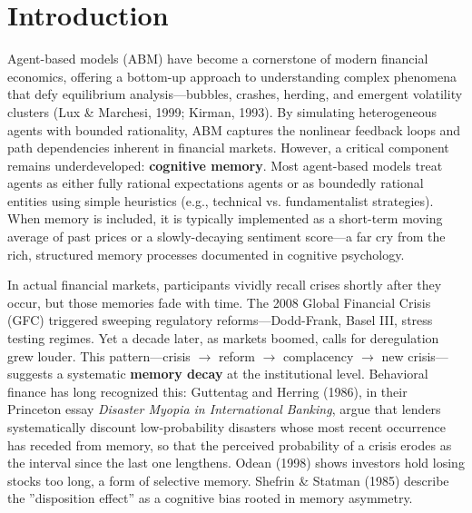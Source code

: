 \documentclass[11pt]{article}
\begin{document}
\begin{abstract}
it reduces return. The original 15.0\% gap (3947 vs 3434) was measured under the default memory bank (initial stabilities 5/3/2, not S=45) and is a seed/network artifact; it is retained in Section 5.2 for audit only. The effective policy on 30 agents is non-intervention. The 1,000-agent run rerun at S=45 (Section 5.3; v49 pre-fix, v50 post-fix identical) gives identical returns for both policies (-1065.35, interventions 0.0), so the v47/v48 374\% figure does not survive at S=45 and is retained in Section 5.3 for audit only (see Section 6.4, limitation 11). Our work bridges cognitive psychology and computational finance: the primary implication is about model choice --- memory kernels, not policy levers, decide how long markets remember.

\textbf{Keywords:} spaced repetition, cognitive memory, agent-based modeling, FSRS, power-law forgetting, POMDP

\textbf{JEL codes:} G01, G17, C63

\end{abstract}
\section{Introduction}
Agent-based models (ABM) have become a cornerstone of modern financial economics, offering a bottom-up approach to understanding complex phenomena that defy equilibrium analysis---bubbles, crashes, herding, and emergent volatility clusters (Lux \& Marchesi, 1999; Kirman, 1993). By simulating heterogeneous agents with bounded rationality, ABM captures the nonlinear feedback loops and path dependencies inherent in financial markets. However, a critical component remains underdeveloped: \textbf{cognitive memory}. Most agent-based models treat agents as either fully rational expectations agents or as boundedly rational entities using simple heuristics (e.g., technical vs. fundamentalist strategies). When memory is included, it is typically implemented as a short-term moving average of past prices or a slowly-decaying sentiment score---a far cry from the rich, structured memory processes documented in cognitive psychology.

In actual financial markets, participants vividly recall crises shortly after they occur, but those memories fade with time. The 2008 Global Financial Crisis (GFC) triggered sweeping regulatory reforms---Dodd-Frank, Basel III, stress testing regimes. Yet a decade later, as markets boomed, calls for deregulation grew louder. This pattern---crisis $\rightarrow$ reform $\rightarrow$ complacency $\rightarrow$ new crisis---suggests a systematic \textbf{memory decay} at the institutional level. Behavioral finance has long recognized this: Guttentag and Herring (1986), in their Princeton essay \textit{Disaster Myopia in International Banking}, argue that lenders systematically discount low-probability disasters whose most recent occurrence has receded from memory, so that the perceived probability of a crisis erodes as the interval since the last one lengthens. Odean (1998) shows investors hold losing stocks too long, a form of selective memory. Shefrin \& Statman (1985) describe the ''disposition effect'' as a cognitive bias rooted in memory asymmetry.
\end{document}
